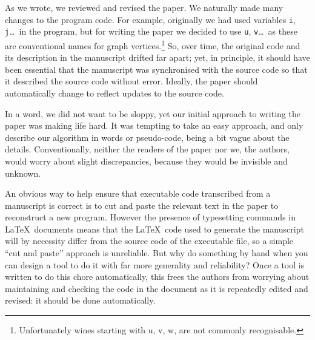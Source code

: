 \documentclass[prodmode,acmtecs]{acmsmall} %
\begin{document}
As we wrote, we reviewed and revised the paper. We naturally made many changes to the program code. For example, originally we had used variables \texttt{i}, \texttt{j}\ldots\ in the program, but for writing the paper we decided to use \texttt{u}, \texttt{v}\ldots\ as these are conventional names for graph vertices.\footnote{Unfortunately wines starting with u, v, w, are not commonly recognisable.} So, over time, the original code and its description in the manuscript drifted far apart; yet, in principle, it should have been essential that the manuscript was synchronised with the source code so that it described the source code without error. Ideally, the paper should automatically change to reflect updates to the source code.

In a word, we did not want to be sloppy, yet our initial approach to writing the paper was making life hard. It was tempting to take an easy approach, and only describe our algorithm in words or pseudo-code, being a bit vague about the details. Conventionally, neither the readers of the paper nor we, the authors, would worry about slight discrepancies, because they would be invisible and unknown.

An obvious way to help ensure that executable code transcribed from a manuscript is correct is to cut and paste the relevant text in the paper to reconstruct a new program. However the presence of typesetting commands in \LaTeX\ documents means that the \LaTeX\ code used to generate the manuscript will by necessity differ from the source code of the executable file, so a simple ``cut and paste'' approach is unreliable. But why do something by hand when you can design a tool to do it with far more generality and reliability? Once a tool is written to do this chore automatically, this frees the authors from worrying about maintaining and checking the code in the document as it is repeatedly edited and revised: it should be done automatically.
\end{document}
